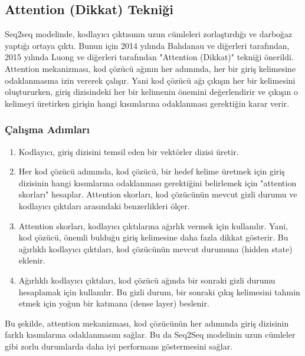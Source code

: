 \subsection{Attention (Dikkat) Tekniği}
Seq2seq modelinde, kodlayıcı çıktısının uzun cümleleri zorlaştırdığı ve darboğaz yaptığı ortaya çıktı. Bunun için 2014 yılında Bahdanau ve diğerleri tarafından, 2015 yılında Luong ve diğerleri tarafından "Attention (Dikkat)" tekniği önerildi. Attention mekanizması, kod çözücü ağının her adımında, her bir giriş kelimesine odaklanmasına izin vererek çalışır. Yani kod çözücü ağı çıkışın her bir kelimesini oluştururken, giriş dizisindeki her bir kelimenin önemini değerlendirir ve çıkışın o kelimeyi üretirken girişin hangi kısımlarına odaklanması gerektiğin karar verir.

\subsubsection{Çalışma Adımları}
\begin{enumerate}
    \item Kodlayıcı, giriş dizisini temsil eden bir vektörler dizisi üretir. 
    \item Her kod çözücü adımında, kod çözücü, bir hedef kelime üretmek için giriş dizisinin hangi kısımlarına odaklanması gerektiğini belirlemek için "attention skorları" hesaplar. Attention skorları, kod çözücünün mevcut gizli durumu ve kodlayıcı çıktıları arasındaki benzerlikleri ölçer.
    \item Attention skorları, kodlayıcı çıktılarına ağırlık vermek için kullanılır. Yani, kod çözücü, önemli bulduğu giriş kelimesine daha fazla dikkat gösterir. Bu ağırlıklı kodlayıcı çıktıları, kod çözücünün mevcut durumuna (hidden state) eklenir.
    \item Ağırlıklı kodlayıcı çıktıları, kod çözücü ağında bir sonraki gizli durumu hesaplamak için kullanılır. Bu gizli durum, bir sonraki çıkış kelimesini tahmin etmek için yoğun bir katmana (dense layer) beslenir.
\end{enumerate}

Bu şekilde, attention mekanizması, kod çözücünün her adımında giriş dizisinin farklı kısımlarına odaklanmasını sağlar. Bu da Seq2Seq modelinin uzun cümleler gibi zorlu durumlarda daha iyi performans göstermesini sağlar.

\newpage